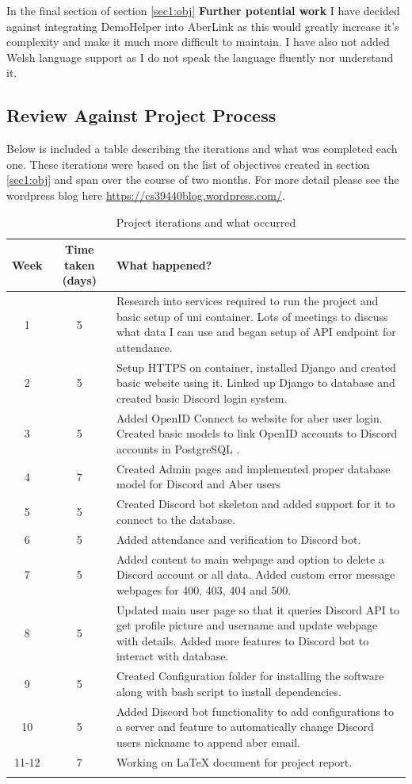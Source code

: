In the final section of section \ref{sec1:obj} \textbf{Further potential work} I have decided against integrating DemoHelper into AberLink as this would greatly increase it's complexity and make it much more difficult to maintain. I have also not added Welsh language support as I do not speak the language fluently nor understand it.

\subsection{Review Against Project Process}

Below is included a table describing the iterations and what was completed each one. These iterations were based on the list of objectives created in section \ref{sec1:obj} and span over the course of two months. For more detail please see the wordpress blog here \href{https://cs39440blog.wordpress.com/}{https://cs39440blog.wordpress.com/}.

\begin{longtable}[H]{| c | c | p{9cm} |}
\hline
Week & Time taken (days) & What happened? \\
\hline
1 & 5 & Research into services required to run the project and basic setup of uni container. Lots of meetings to discuss what data I can use and began setup of API endpoint for attendance. \\
\hline
2 & 5 & Setup HTTPS on container, installed Django \cite{Django} and created basic website using it. Linked up Django to database and created basic Discord login system. \\
\hline
3 & 5 & Added OpenID Connect \cite{OpenID} to website for aber user login. Created basic models to link OpenID accounts to Discord accounts in PostgreSQL \cite{psql}. \\
\hline
4 & 7 & Created Admin pages and implemented proper database model for Discord and Aber users\\
\hline
5 & 5 & Created Discord bot skeleton and added support for it to connect to the database.\\
\hline
6 & 5 & Added attendance and verification to Discord bot. \\
\hline
7 & 5 & Added content to main webpage and option to delete a Discord account or all data. Added custom error message webpages for 400, 403, 404 and 500. \\
\hline
8 & 5 & Updated main user page so that it queries Discord API to get profile picture and username and update webpage with details. Added more features to Discord bot to interact with database.\\
\hline
9 & 5 & Created Configuration folder for installing the software along with bash script to install dependencies.\\
\hline
10 & 5 & Added Discord bot functionality to add configurations to a server and feature to automatically change Discord users nickname to append aber email.\\
\hline
11-12 & 7 & Working on LaTeX document for project report. \\
\hline
\caption{Project iterations and what occurred}
\label{tab:project-iterations}
\end{longtable}

